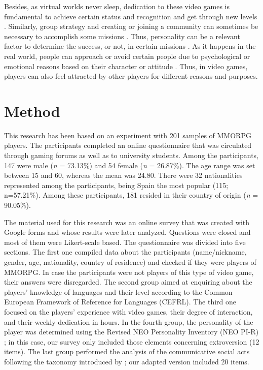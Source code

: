 \documentclass[english]{textolivre}
\begin{document}
Besides, as virtual worlds never sleep, dedication to these video games is fundamental to achieve certain status and recognition and get through new levels \cite{nagy2016, stone2016}. Similarly, group strategy and creating or joining a community can sometimes be necessary to accomplish some missions \cite{whang2004}. Thus, personality can be a relevant factor to determine the success, or not, in certain missions \cite{collins2012, mancini2017}. As it happens in the real world, people can approach or avoid certain people due to psychological or emotional reasons based on their character or attitude \cite{mccreery2015}. Thus, in video games, players can also feel attracted by other players for different reasons and purposes. 

\section{Method}
This research has been based on an experiment with 201 samples of MMORPG players. The participants completed an online questionnaire that was circulated through gaming forums as well as to university students. Among the participants, 147 were male (\emph{n} = 73.13\%) and 54 female (\emph{n} = 26.87\%). The age range was set between 15 and 60, whereas the mean was 24.80. There were 32 nationalities represented among the participants, being Spain the most popular (115; n=57.21\%). Among these participants, 181 resided in their country of origin (\emph{n} = 90.05\%). 

The material used for this research was an online survey that was created with Google forms and whose results were later analyzed. Questions were closed and most of them were Likert-scale based. The questionnaire was divided into five sections. The first one compiled data about the participants (name/nickname, gender, age, nationality, country of residence) and checked if they were players of MMORPG. In case the participants were not players of this type of video game, their answers were disregarded. The second group aimed at enquiring about the players' knowledge of languages and their level according to the Common European Framework of Reference for Languages (CEFRL). The third one focused on the players’ experience with video games, their degree of interaction, and their weekly dedication in hours. In the fourth group, the personality of the player was determined using the Revised NEO Personality Inventory (NEO PI-R) \cite{costa1992}; in this case, our survey only included those elements concerning extroversion (12 items). The last group performed the analysis of the communicative social acts following the taxonomy introduced by \textcite{guntermann1982}; our adapted version included 20 items. 
\end{document}

